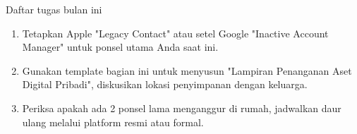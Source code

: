 \begin{tcbpractice}{Daftar tugas bulan ini}
\begin{enumerate}
  \item Tetapkan Apple "Legacy Contact" atau setel Google "Inactive Account Manager" untuk ponsel utama Anda saat ini.
  \item Gunakan template bagian ini untuk menyusun "Lampiran Penanganan Aset Digital Pribadi", diskusikan lokasi penyimpanan dengan keluarga.
  \item Periksa apakah ada 2 ponsel lama menganggur di rumah, jadwalkan daur ulang melalui platform resmi atau formal.
\end{enumerate}

\end{tcbpractice}
